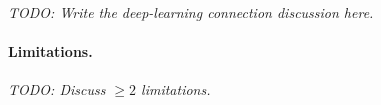 \textit{TODO: Write the deep-learning connection discussion here.}

\paragraph{Limitations.}

\textit{TODO: Discuss $\geq 2$ limitations.}
